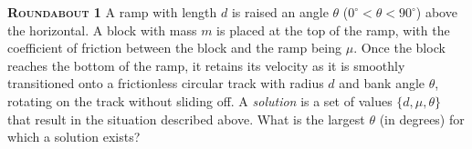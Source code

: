 \begin{problem}
{\textbf{\textsc{Roundabout 1}}} A ramp with length $d$ is raised an angle $\theta$ ($0^{\circ} < \theta < 90^{\circ}$) above the horizontal. A block with mass $m$ is placed at the top of the ramp, with the coefficient of friction between the block and the ramp being $\mu$. Once the block reaches the bottom of the ramp, it retains its velocity as it is smoothly transitioned onto a frictionless circular track with radius $d$ and bank angle $\theta$, rotating on the track without sliding off. A \emph{solution} is a set of values $\{d, \mu, \theta\}$ that result in the situation described above. What is the largest $\theta$ (in degrees) for which a solution exists? 

\end{problem}